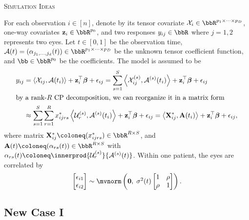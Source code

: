 \documentclass[10pt]{notes}
\begin{document}
\thispagestyle{firstpage}
\begin{center}
    \large\textsc{Simulation Ideas}
\end{center}

For each observation $i\in [n]$, denote by its tensor covariate $\mathcal{X}_i\in\bbR^{p_1\times\cdots\times p_D}$, one-way covariates $\mathbf{z}_i\in\bbR^{p_0}$, and two responses $y_{ij}\in\bbR$ where $j=1,2$ represents two eyes. Let $t\in[0,1]$ be the observation time, $\mathcal{A}(t)=(\alpha_{j_1,\dots,j_d}(t))\in\bbR^{p_1\times\cdots\times p_D}$ be the unknown tensor coefficient function, and $\bb\in\bbR^{p_0}$ be the coefficients. The model is assumed to be
\begin{align}
\label{eq-model0}
y_{ij}
&= \left\langle \mathcal{X}_{ij}, \mathcal{A}(t_i) \right\rangle
   + \mathbf{z}_i^\top \boldsymbol{\beta}
   + \epsilon_{ij} = \sum_{s=1}^S
   \left\langle \mathcal{X}_{ij}^{(s)}, \mathcal{A}^{(s)}(t_i) \right\rangle
   + \mathbf{z}_i^\top \boldsymbol{\beta}
   + \epsilon_{ij} \\
\intertext{by a rank-$R$ CP decomposition, we can reorganize it in a matrix form}
&\approx \sum_{s=1}^S \sum_{r=1}^R
   x_{ijrs}^{*}
   \left\langle
   \mathcal{U}_r^{(s)},
   \mathcal{A}^{(s)}(t_i)
   \right\rangle
   + \mathbf{z}_i^\top \boldsymbol{\beta}
   + \epsilon_{ij} 
   = \left\langle \mathbf{X}_{ij}^{*}, \mathbf{A}(t_i) \right\rangle
   + \mathbf{z}_i^\top \boldsymbol{\beta}
   + \epsilon_{ij},
   \nonumber
\end{align}
where matrix $\mathbf{X}_{ij}^{*}\coloneq(x_{ijrs}^*)\in\bbR^{R\times S}$, and $\mathbf{A}(t)\coloneq (\alpha_{rs}(t))\in\bbR^{R\times S}$ with $\alpha_{rs}(t)\coloneq \innerprod{\mathcal{U}_r^{(s)}}{\mathcal{A}^{(s)}(t)}$. Within one patient, the eyes are correlated by
\begin{align*}
    \begin{bmatrix}
        \epsilon_{i1}\\ \epsilon_{i2}
    \end{bmatrix}\sim 
    \mvnorm\begin{pmatrix}
        \mathbf{0},\; \sigma^2(t)\begin{bmatrix}
            1 & \rho\\ 
            \rho & 1
        \end{bmatrix}
    \end{pmatrix}.
\end{align*}

\subsection{New Case I}
\end{document}
